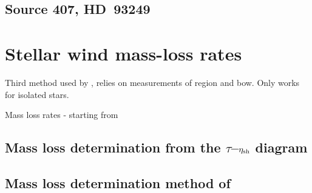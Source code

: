 \subsection{Source 407, HD~93249}
\label{sec:source-407}




\section{Stellar wind mass-loss rates}
\label{sec:stellar-wind-mass}

Third method used by \citet{Gvaramadze:2012a}, relies on measurements
of \hii{} region and bow. Only works for isolated stars.

Mass loss rates - starting from \citet{Kobulnicky:2010a}

\subsection{Mass loss determination from the \(\tau\)--\(\eta_{\text{sh}}\) diagram}
\label{sec:mass-loss-determ}



\subsection{Mass loss determination method of \protect\citet{Kobulnicky:2018a}}
\label{app:bow-shock-data}




